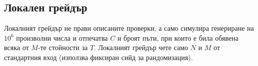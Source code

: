 \documentclass[12pt]{article}
\begin{document}
\subsection{Локален грейдър}

Локалният грейдър не прави описаните проверки, а само симулира генериране на $10^6$ произволни числа и отпечатва $C$ и броят пъти, при които е била обявена всяка от $M$-те стойности за $T$. Локалният грейдър чете само $N$ и $M$ от стандартния вход (използва фиксиран сийд за рандомизация).
\end{document}
